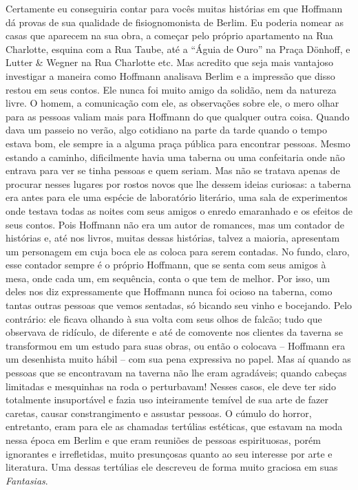 Certamente eu conseguiria contar para vocês muitas histórias em que
Hoffmann dá provas de sua qualidade de fisiognomonista de Berlim. Eu
poderia nomear as casas que aparecem na sua obra, a começar pelo próprio
apartamento na Rua Charlotte, esquina com a
Rua Taube, até a ``Águia de Ouro'' na Praça
Dönhoff, e Lutter \& Wegner na Rua Charlotte etc. Mas acredito que seja
mais vantajoso investigar a maneira como Hoffmann analisava Berlim e a
impressão que disso restou em seus contos. Ele nunca foi muito amigo da
solidão, nem da natureza livre. O homem, a comunicação com ele, as
observações sobre ele, o mero olhar para as pessoas valiam mais para
Hoffmann do que qualquer outra coisa. Quando dava um passeio no verão,
algo cotidiano na parte da tarde quando o tempo estava bom, ele sempre
ia a alguma praça pública para encontrar pessoas. Mesmo estando a
caminho, dificilmente havia uma taberna ou uma confeitaria onde não
entrava para ver se tinha pessoas e quem seriam. Mas não se tratava
apenas de procurar nesses lugares por rostos novos que lhe dessem ideias
curiosas: a taberna era antes para ele uma espécie de laboratório
literário, uma sala de experimentos onde testava todas as noites com
seus amigos o enredo emaranhado e os efeitos de seus contos. Pois
Hoffmann não era um autor de romances, mas um contador de histórias e,
até nos livros, muitas dessas histórias, talvez a maioria, apresentam um personagem
em cuja boca ele as coloca para serem contadas. No fundo, claro, esse
contador sempre é o próprio Hoffmann, que se senta com seus amigos à
mesa, onde cada um, em sequência, conta o que tem de melhor. Por isso,
um deles nos diz expressamente que Hoffmann nunca foi ocioso na taberna,
como tantas outras pessoas que vemos sentadas, só bicando seu vinho e
bocejando. Pelo contrário: ele ficava olhando à sua volta com seus olhos
de falcão; tudo que observava de ridículo, de diferente e até de
comovente nos clientes da taverna se transformou em um estudo para suas
obras, ou então o colocava -- Hoffmann era um desenhista muito hábil --
com sua pena expressiva no papel. Mas aí quando as pessoas que se
encontravam na taverna não lhe eram agradáveis; quando cabeças limitadas
e mesquinhas na roda o perturbavam! Nesses casos, ele deve ter sido
totalmente insuportável e fazia uso inteiramente temível de sua arte de
fazer caretas, causar constrangimento e assustar pessoas. O cúmulo do
horror, entretanto, eram para ele as chamadas tertúlias estéticas, que
estavam na moda nessa época em Berlim e que eram reuniões de pessoas
espirituosas, porém ignorantes e irrefletidas, muito presunçosas quanto
ao seu interesse por arte e literatura. Uma dessas tertúlias ele
descreveu de forma muito graciosa em suas \emph{Fantasias}.

